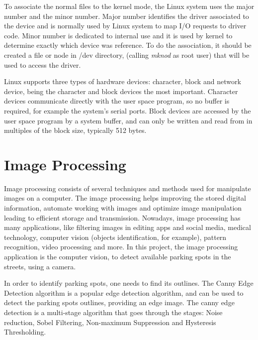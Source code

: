To associate the normal files to the kernel mode, the Linux system uses the major number and the minor number. Major number identifies the driver associated to the device and is normally used by Linux system to map I/O requests to driver code. Minor number is dedicated to internal use and it is used by kernel to determine exactly which device was reference. To do the association, it should be created a file or node in /dev directory, (calling \textit{mknod} as root user) that will be used to access the driver.

Linux supports three types of hardware devices: character, block and network device, being the character and block devices the most important. Character devices communicate directly with the user space program, so no buffer is required, for example the system’s serial ports. Block devices are accessed by the user space program by a system buffer, and can only be written and read from in multiples of the block size, typically 512 bytes. \cite{linux_progr_interface}

\section{Image Processing}

Image processing consists of several techniques and methods used for manipulate images on a computer. The image processing helps improving the stored digital information, automate working with images and optimize image manipulation leading to efficient storage and transmission. Nowadays, image processing has many applications, like filtering images in editing apps and social media, medical technology, computer vision (objects identification, for example), pattern recognition, video processing and more. In this project, the image processing application is the computer vision, to detect available parking spots in the streets, using a camera.

In order to identify parking spots, one needs to find its outlines. The Canny Edge Detection \cite{canny} algorithm is a popular edge detection algorithm, and can be used to detect the parking spots outlines, providing an edge image. The canny edge detection is a multi-stage algorithm that goes through the stages: Noise reduction, Sobel Filtering, Non-maximum Suppression and Hysteresis Thresholding.

